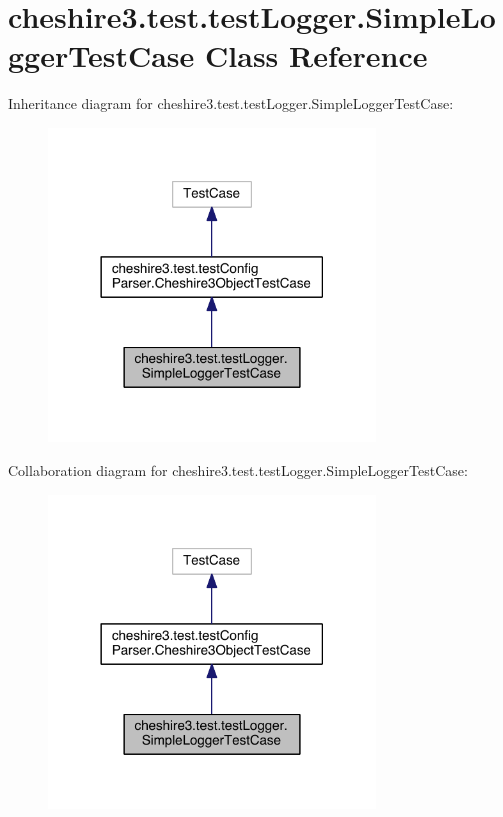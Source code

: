 \hypertarget{classcheshire3_1_1test_1_1test_logger_1_1_simple_logger_test_case}{\section{cheshire3.\-test.\-test\-Logger.\-Simple\-Logger\-Test\-Case Class Reference}
\label{classcheshire3_1_1test_1_1test_logger_1_1_simple_logger_test_case}
}


Inheritance diagram for cheshire3.\-test.\-test\-Logger.\-Simple\-Logger\-Test\-Case\-:
\nopagebreak
\begin{figure}[H]
\begin{center}
\leavevmode
\includegraphics[width=246pt]{classcheshire3_1_1test_1_1test_logger_1_1_simple_logger_test_case__inherit__graph}
\end{center}
\end{figure}


Collaboration diagram for cheshire3.\-test.\-test\-Logger.\-Simple\-Logger\-Test\-Case\-:
\nopagebreak
\begin{figure}[H]
\begin{center}
\leavevmode
\includegraphics[width=246pt]{classcheshire3_1_1test_1_1test_logger_1_1_simple_logger_test_case__coll__graph}
\end{center}
\end{figure}
